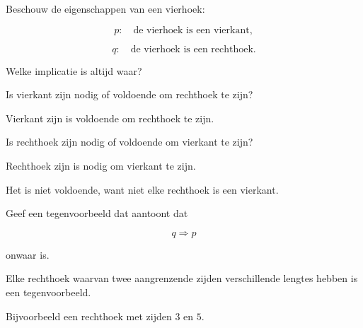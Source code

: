 \documentclass{ximera}
\begin{document}
\begin{oefening}{\oefU\ESS}

Beschouw de eigenschappen van een vierhoek:

\[
p:\quad \text{de vierhoek is een vierkant},
\]

\[
q:\quad \text{de vierhoek is een rechthoek}.
\]

\begin{question}

Welke implicatie is altijd waar?

\begin{multipleChoice}



\end{multipleChoice}

\end{question}


\begin{question}

Is vierkant zijn nodig of voldoende om rechthoek te zijn?

\begin{oplossing}

Vierkant zijn is voldoende om rechthoek te zijn.

\end{oplossing}

\end{question}


\begin{question}

Is rechthoek zijn nodig of voldoende om vierkant te zijn?

\begin{oplossing}

Rechthoek zijn is nodig om vierkant te zijn.

Het is niet voldoende, want niet elke rechthoek is een vierkant.

\end{oplossing}

\end{question}


\begin{question}

Geef een tegenvoorbeeld dat aantoont dat

\[
q\Rightarrow p
\]

onwaar is.

\begin{oplossing}

Elke rechthoek waarvan twee aangrenzende zijden verschillende lengtes
hebben is een tegenvoorbeeld.

Bijvoorbeeld een rechthoek met zijden $3$ en $5$.

\end{oplossing}

\end{question}

\end{oefening}
\end{document}
